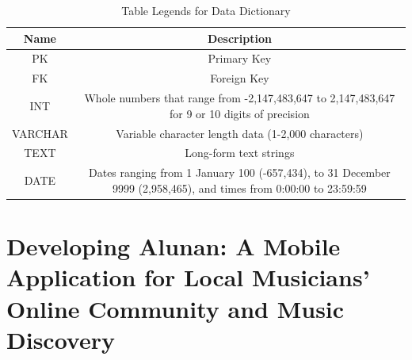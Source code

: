 \begin{enumerate}[A.]
\begin{landscape}
    \begin{table}[h]
        \centering
        \captionsetup{justification=centering} %
        \caption{Table Legends for Data Dictionary}
        \begin{tabular}{|c|c|}
        \hline
        \textbf{Name} & \textbf{Description} \\
        \hline
        PK & Primary Key \\
        \hline
        FK & Foreign Key \\
        \hline
        INT & Whole numbers that range from -2,147,483,647 to 2,147,483,647 for 9 or 10 digits of precision \\
        \hline
        VARCHAR & Variable character length data (1-2,000 characters) \\
        \hline
        TEXT & Long-form text strings \\
        \hline
        DATE & Dates ranging from 1 January 100 (-657,434), to 31 December 9999 (2,958,465), and times from 0:00:00 to 23:59:59 \\
        \hline
        \end{tabular}
    \end{table}

    \end{landscape}
\end{enumerate}

\section{Developing Alunan: A Mobile Application for Local Musicians’ Online Community and Music Discovery}
